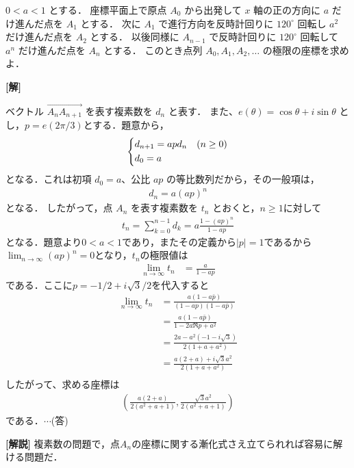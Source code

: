 \documentclass[a4paper,10pt]{ltjsarticle}
\begin{document}
\begin{oframed}
$0 < a < 1$ とする．
座標平面上で原点 $A_0$ から出発して $x$ 軸の正の方向に $a$ だけ進んだ点を $A_1$ とする．
次に $A_1$ で進行方向を反時計回りに $120^\circ$ 回転し $a^2$ だけ進んだ点を $A_2$ とする．
以後同様に $A_{n-1}$ で反時計回りに $120^\circ$ 回転して $a^n$ だけ進んだ点を $A_n$ とする．
このとき点列 $A_0, A_1, A_2, \dots$ の極限の座標を求めよ．
\end{oframed}
\setlength{\columnseprule}{0.4pt}
\begin{multicols}{2}
{\bf[解]}


ベクトル $\vec{A_n A_{n+1}}$ を表す複素数を $d_n$ と表す．
また、$e(\theta) = \cos\theta + i\sin\theta$ とし，$p=e(2\pi/3)$とする．題意から，
\begin{align*}
\begin{dcases}
d_{n+1} = a p d_n & (n \ge 0) \\
d_0 = a &
\end{dcases}  
\end{align*}
となる．これは初項 $d_0 = a$、公比 $ap$ の等比数列だから，その一般項は，
\begin{align*}
d_n = a(ap)^n  
\end{align*}
となる．
したがって，点 $A_n$ を表す複素数を $t_n$ とおくと，$n\ge 1$に対して
\begin{align}
 t_n = \sum_{k=0}^{n-1} d_k = a \frac{1-(ap)^n}{1-ap}  
\end{align}
となる．題意より$0<a<1$であり，またその定義から$|p|=1$であるから
$\lim_{n \to \infty} (ap)^n = 0$となり，$t_n$の極限値は
\begin{align*}
    \lim_{n \to \infty} t_n &= \frac{a}{1-ap} 
\end{align*}
である．ここに$p=-1/2+i\sqrt{3}/2$を代入すると
\begin{align*}
    \lim_{n \to \infty} t_n
    &= \frac{a(1-a\bar{p})}{(1-ap)(1-a\bar{p})} \\
    &= \frac{a(1-a\bar{p})}{1-2a\Re p + a^2} \\
    &= \frac{2a-a^2(-1-i\sqrt{3})}{2(1+a + a^2)} \\
    &= \frac{a(2+a)+i\sqrt{3}a^2}{2(1+a + a^2)} \\
\end{align*}
したがって、求める座標は
\begin{align*}
\left( \frac{a(2+a)}{2(a^2+a+1)}, \frac{\sqrt{3}a^2}{2(a^2+a+1)} \right)  
\end{align*}
である．$\cdots$(答)

\vspace{10pt}
{\bf[解説]}
複素数の問題で，点$A_n$の座標に関する漸化式さえ立てられれば容易に解ける問題だ．

\newpage
\end{multicols}
\end{document}
